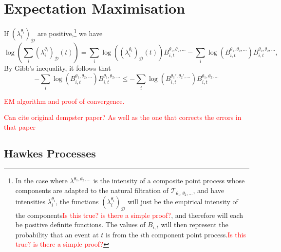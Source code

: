 \documentclass[honours,12pt]{unswthesis}
\numberwithin{equation}{section}
\begin{document}
\section{Expectation Maximisation}
If $\left(\lambda_i^{\theta_i}\right)_\mathcal{D}$ are positive,\footnote{ In the case where $\lambda^{\theta_1,\theta_2,\ldots}$ is the intensity of a composite point process whose components are adapted to the natural filtration of $\mathcal{T}_{\theta_1,\theta_2,\ldots}$, and have intensities $\lambda_i^{\theta_i}$, the functions $\left(\lambda_i^{\theta_i}\right)_\mathcal{D}$ will just be the empirical intensity of the components\textcolor{red}{Is this true? is there a simple proof?}, and therefore will each be positive definite functions. The values of $B_{i,t}$ will then represent the probability that an event at $t$ is from the $i$th component point process.\textcolor{red}{Is this true? is there a simple proof?} } we have
$$\log\left(\sum_i \left(\lambda_i^{\theta_i}\right)_{\mathcal{D}}(t)\right) = \sum_i \log\left(\left(\lambda_i^{\theta_i}\right)_\mathcal{D}(t)\right)B_{i,t}^{\theta_1,\theta_2,\ldots} - \sum_i \log\left( B_{i,t}^{\theta_1,\theta_2,\ldots}\right)B_{i,t}^{\theta_2,\theta_2,\ldots},$$
By Gibb's inequality, it follows that
$$- \sum_i \log\left( B_{i,t}^{\theta_1,\theta_2,\ldots}\right)B_{i,t}^{\theta_1,\theta_2,\ldots} \leq - \sum_i \log\left( B_{i,t}^{\theta_1',\theta_2',\ldots}\right)B_{i,t}^{\theta_1,\theta_2,\ldots} $$

\textcolor{red}{EM algorithm and proof of convergence.}


\textcolor{red}{Can cite original dempster paper? As well as the one that corrects the errors in that paper}

\subsection{Hawkes Processes}
\end{document}
